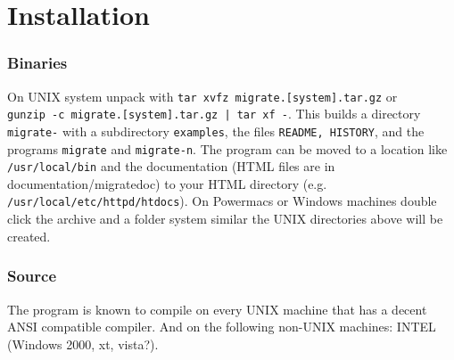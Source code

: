 \chapter{Installation}
\subsection{Binaries}
On UNIX system unpack with {\tt tar xvfz migrate.[system].tar.gz} or\\ {\tt gunzip -c migrate\VERSION .[system].tar.gz | tar xf -}.
This builds a directory {\tt migrate-\VERSION}
with a subdirectory {\tt examples},
the files {\tt README, HISTORY}, and the programs 
{\tt migrate} and {\tt migrate-n}. 
The program can be moved to a location like {\tt /usr/local/bin} 
and the documentation (HTML files are in documentation/migratedoc) to
your HTML directory (e.g. {\tt /usr/local/etc/httpd/htdocs}).
On Powermacs or Windows machines double click the archive 
and a folder system similar the UNIX directories above will be created.

\subsection{Source}
The program is known to compile on
every UNIX machine that has a decent ANSI compatible compiler.
And on the following non-UNIX machines:  INTEL (Windows 2000, xt, vista?).


